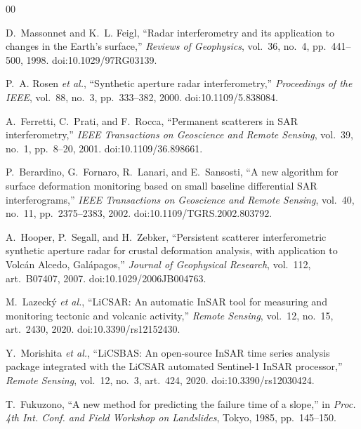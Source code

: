 \documentclass[journal]{IEEEtran}
\begin{document}
\begin{thebibliography}{00}

 D.~Massonnet and K.~L. Feigl, ``Radar interferometry and its application to changes in the
Earth's surface,'' \emph{Reviews of Geophysics}, vol.~36, no.~4, pp.~441--500, 1998. doi:10.1029/97RG03139.

 P.~A. Rosen \emph{et al.}, ``Synthetic aperture radar interferometry,'' \emph{Proceedings of the
IEEE}, vol.~88, no.~3, pp.~333--382, 2000. doi:10.1109/5.838084.

 A.~Ferretti, C.~Prati, and F.~Rocca, ``Permanent scatterers in SAR interferometry,''
\emph{IEEE Transactions on Geoscience and Remote Sensing}, vol.~39, no.~1, pp.~8--20, 2001. doi:10.1109/36.898661.

 P.~Berardino, G.~Fornaro, R.~Lanari, and E.~Sansosti, ``A new algorithm for surface
deformation monitoring based on small baseline differential SAR interferograms,'' \emph{IEEE Transactions on
Geoscience and Remote Sensing}, vol.~40, no.~11, pp.~2375--2383, 2002. doi:10.1109/TGRS.2002.803792.

 A.~Hooper, P.~Segall, and H.~Zebker, ``Persistent scatterer interferometric synthetic aperture
radar for crustal deformation analysis, with application to Volc\'an Alcedo, Gal\'apagos,'' \emph{Journal of
Geophysical Research}, vol.~112, art.~B07407, 2007. doi:10.1029/2006JB004763.

 M.~Lazeck\'y \emph{et al.}, ``LiCSAR: An automatic InSAR tool for measuring and monitoring
tectonic and volcanic activity,'' \emph{Remote Sensing}, vol.~12, no.~15, art.~2430, 2020. doi:10.3390/rs12152430.

 Y.~Morishita \emph{et al.}, ``LiCSBAS: An open-source InSAR time series analysis package
integrated with the LiCSAR automated Sentinel-1 InSAR processor,'' \emph{Remote Sensing}, vol.~12, no.~3,
art.~424, 2020. doi:10.3390/rs12030424.

 T.~Fukuzono, ``A new method for predicting the failure time of a slope,'' in \emph{Proc. 4th
Int. Conf. and Field Workshop on Landslides}, Tokyo, 1985, pp.~145--150.

\end{thebibliography}
\end{document}
